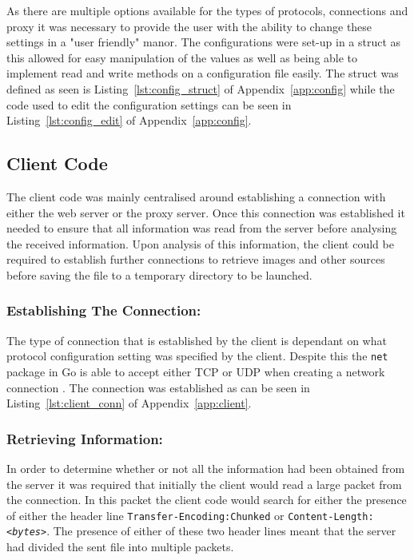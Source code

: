 \documentclass[10pt,twocolumn]{witseiepaper}
\begin{document}
		As there are multiple options available for the types of protocols, connections and proxy it was necessary to provide the user with the ability to change these settings in a "user friendly" manor. The configurations were set-up in a struct as this allowed for easy manipulation of the values as well as being able to implement read and write methods on a configuration file easily. The struct was defined as seen is Listing~\ref{lst:config_struct} of Appendix~\ref{app:config} while the code used to edit the configuration settings can be seen in Listing~\ref{lst:config_edit} of Appendix~\ref{app:config}. 
		
		
	\subsection{Client Code}
		
		The client code was mainly centralised around establishing a connection with either the web server or the proxy server. Once this connection was established it needed to ensure that all information was read from the server before analysing the received information. Upon analysis of this information, the client could be required to establish further connections to retrieve images and other sources before saving the file to a temporary directory to be launched. \\
		
		\subsubsection*{Establishing The Connection:} The type of connection that is established by the client is dependant on what protocol configuration setting was specified by the client. Despite this the \texttt{net} package in Go is able to accept either TCP or UDP when creating a network connection \cite{net}. The connection was established as can be seen in Listing~\ref{lst:client_conn} of Appendix~\ref{app:client}. 
		
		\subsubsection*{Retrieving Information:} In order to determine whether or not all the information had been obtained from the server it was required that initially the client would read a large packet from the connection. In this packet the client code would search for either the presence of either the header line \texttt{Transfer-Encoding:Chunked} or \texttt{Content-Length:\textit{<bytes>}}. The presence of either of these two header lines meant that the server had divided the sent file into multiple packets. \\
		
\end{document}
